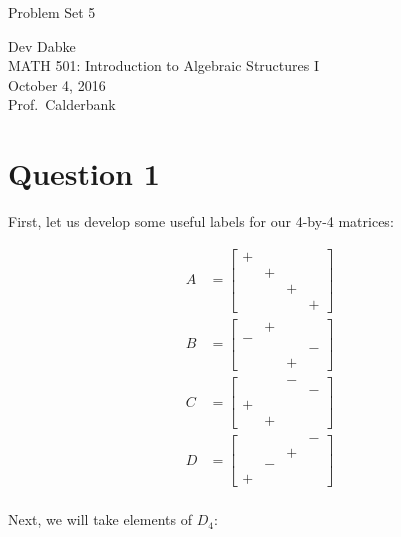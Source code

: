 \documentclass[letterpaper]{article}
\def\name{Problem Set 5}
\begin{document}
{\huge \name}


\vspace{0.25in}

Dev Dabke \\
MATH 501: Introduction to Algebraic Structures I \\
October 4, 2016 \\
Prof.\ Calderbank \\

\section{Question 1}
\label{sec:Question1}

First, let us develop some useful labels for our 4-by-4 matrices:

\begin{align*}
    A &=
    \begin{bmatrix} + & & & \\ & + & & \\ & & + & \\ & & & + \end{bmatrix}
    \\
    B &=
    \begin{bmatrix} & + & & \\ - & & & \\ & & & - \\ & & + & \end{bmatrix}
    \\
    C &= \begin{bmatrix} & & - & \\ & & & - \\ + & & & \\ & + & & \end{bmatrix}
    \\
    D &=
    \begin{bmatrix} & & & - \\ & & + & \\ & - & & \\ + & & & \end{bmatrix}
    \\
\end{align*}

Next, we will take elements of $ D_4 $:
\end{document}
